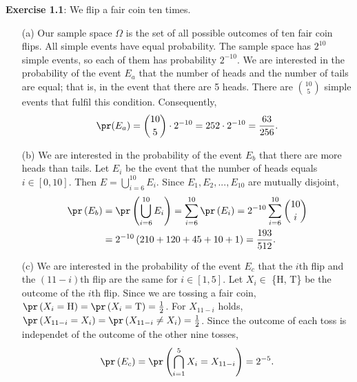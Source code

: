 \textbf{Exercise 1.1}: We flip a fair coin ten times.

\begin{enumerate}
  \item[(a)] Our sample space $\Omega$ is the set of all possible outcomes of ten
    fair coin flips. All simple events have equal probability. The sample space has
    $2^{10}$ simple events, so each of them has probability $2^{-10}$. We are
    interested in the probability of the event $E_a$ that the number of heads and
    the number of tails are equal; that is, in the event that there are 5 heads.
    There are $\binom{10}{5}$ simple events that fulfil this condition. Consequently,
    \[
      \pr(E_a) = \binom{10}{5} \cdot 2^{-10} = 252 \cdot 2^{-10} = \frac{63}{256}.
    \]

  \item[(b)] We are interested in the probability of the event $E_b$ that there are
    more heads than tails. Let $E_i$ be the event that the number of heads equals
    $i \in [0, 10]$. Then $E = \bigcup_{i = 6}^{10} E_i$. Since $E_1, E_2,..., E_{10}$
    are mutually disjoint,
    \begin{align*}
      \pr\left(E_b\right)
        &= \pr\left(\bigcup_{i = 6}^{10} E_i \right)      = \sum_{i=6}^{10} \pr\left(E_i\right) = 2^{-10} \sum_{i=6}^{10} \binom{10}{i} \\
        &= 2^{-10} \left( 210 + 120 + 45 + 10 + 1\right)  = \frac{193}{512}.
    \end{align*}

  \item[(c)] We are interested in the probability of the event $E_c$ that the $i$th
    flip and the $(11 - i)$th flip are the same for $i \in [1,5]$. Let
    $X_i \in$ \{H, T\} be the outcome of the $i$th flip. Since we are tossing a
    fair coin, $\pr\left(X_i = \text{H} \right) = \pr\left(X_i = \text{T} \right) = \frac{1}{2}$.
    For $X_{11-i}$ holds, $\pr\left(X_{11-i} = X_i \right) = \pr\left(X_{11-i}
    \not= X_i \right) = \frac{1}{2}$. Since the outcome of each toss is independet
    of the outcome of the other nine tosses,
    \[
      \pr\left(E_c\right)
        = \pr\left(\bigcap_{i=1}^5 X_i = X_{11-i}\right)
        = 2^{-5}.
    \]


\end{enumerate}
